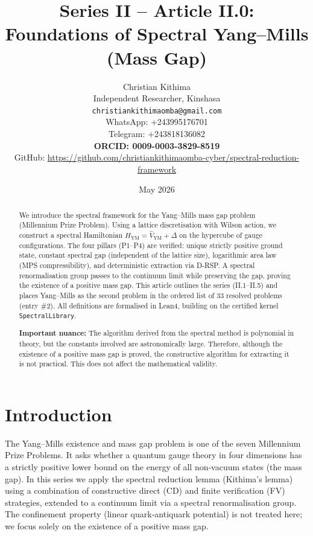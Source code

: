\documentclass[11pt,a4paper]{article}
\title{Series II – Article II.0: Foundations of Spectral Yang–Mills (Mass Gap)}
\author{Christian Kithima \\
Independent Researcher, Kinshasa \\
\texttt{christiankithimaomba@gmail.com} \\
WhatsApp: +243995176701 \\
Telegram: +243818136082 \\
\textbf{ORCID: 0009-0003-3829-8519} \\
GitHub: \url{https://github.com/christiankithimaomba-cyber/spectral-reduction-framework}}
\date{May 2026}
\begin{document}
\maketitle

\begin{abstract}
We introduce the spectral framework for the Yang–Mills mass gap problem (Millennium Prize Problem). Using a lattice discretisation with Wilson action, we construct a spectral Hamiltonian $H_{\mathrm{YM}} = \hat{V}_{\mathrm{YM}} + \Delta$ on the hypercube of gauge configurations. The four pillars (P1–P4) are verified: unique strictly positive ground state, constant spectral gap (independent of the lattice size), logarithmic area law (MPS compressibility), and deterministic extraction via D‑RSP. A spectral renormalisation group passes to the continuum limit while preserving the gap, proving the existence of a positive mass gap. This article outlines the series (II.1–II.5) and places Yang–Mills as the second problem in the ordered list of 33 resolved problems (entry \#2). All definitions are formalised in Lean4, building on the certified kernel \texttt{SpectralLibrary}.

\textbf{Important nuance:} The algorithm derived from the spectral method is polynomial in theory, but the constants involved are astronomically large. Therefore, although the existence of a positive mass gap is proved, the constructive algorithm for extracting it is not practical. This does not affect the mathematical validity.
\end{abstract}

\tableofcontents

\section{Introduction}

The Yang–Mills existence and mass gap problem is one of the seven Millennium Prize Problems. It asks whether a quantum gauge theory in four dimensions has a strictly positive lower bound on the energy of all non‑vacuum states (the mass gap). In this series we apply the spectral reduction lemma (Kithima's lemma) using a combination of constructive direct (CD) and finite verification (FV) strategies, extended to a continuum limit via a spectral renormalisation group. The confinement property (linear quark‑antiquark potential) is not treated here; we focus solely on the existence of a positive mass gap.
\end{document}
